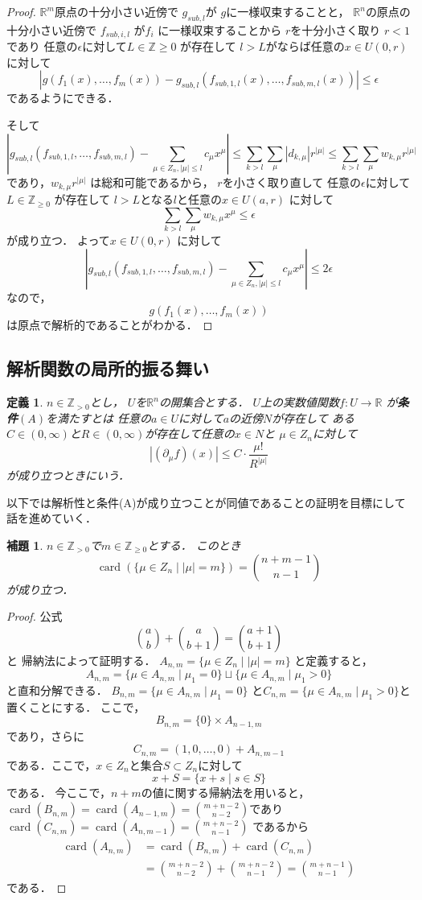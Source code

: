 \documentclass[leqno, a4paper, 12pt]{jsarticle}
\newtheorem{lem}[thm]{補題}
\newtheorem{df}[thm]{定義}
\newcommand{\zz}{\mathbb{Z}}
\newcommand{\rr}{\mathbb{R}}
\DeclareMathOperator{\card}{card}
\begin{document}
\begin{proof}
$\rr^m$原点の十分小さい近傍で
$g_{sub, l}$が
$g$に一様収束することと，
$\rr^n$の原点の十分小さい近傍で
$f_{sub, i, l}$
が$f_{i}$
に一様収束することから
$r$を十分小さく取り
$r<1$であり
任意の$\epsilon$に対して$L\in \zz{\ge 0}$
が存在して
$l>L$がならば任意の$x\in U(0, r)$に対して
\[
|g(f_1(x), \dots, f_m(x))-g_{sub, l}(f_{sub, 1, l}(x), \dots, f_{sub, m, l}(x))|
\le \epsilon
\]
であるようにできる．

そして
\[
\left|
g_{sub, l}(f_{sub, 1, l}, \dots, f_{sub, m, l})-
\sum_{\mu\in Z_n, |\mu|\le l}c_{\mu}x^{\mu}
\right|
\le \sum_{k>l}\sum_{\mu}|d_{k, \mu}|r^{|\mu|}
\le \sum_{k>l}\sum_{\mu}w_{k, \mu}r^{|\mu|} 
\]
であり，$w_{k, \mu}r^{|\mu|}$
は総和可能であるから，
$r$を小さく取り直して
任意の$\epsilon$に対して$L\in \zz_{\ge 0}$
が存在して
$l>L$となる$l$と任意の$x\in U(a, r)$
に対して
\[
\sum_{k>l}\sum_{\mu}w_{k, \mu}x^{\mu}\le \epsilon
\]
が成り立つ．
よって$x\in U(0, r)$
に対して
\[
\left|
g_{sub, l}(f_{sub, 1, l}, \dots, f_{sub, m, l})-
\sum_{\mu\in Z_n, |\mu|\le l}c_{\mu}x^{\mu}
\right|\le 2\epsilon
\]
なので，
\[
g(f_1(x), \dots, f_m(x))
\]
は原点で解析的であることがわかる．
\end{proof}

\subsection{解析関数の局所的振る舞い}
\begin{df}
$n\in \zz_{>0}$とし，
$U$を$\rr^n$の開集合とする．
$U$上の実数値関数$f: U\to \rr$
が\textbf{条件$(A)$}を満たすとは
任意の$a\in U$に対して$a$の近傍$N$が存在して
ある$C\in (0, \infty)$と$R\in (0, \infty)$が存在して任意の$x\in N$と
$\mu\in Z_n$に対して
\[
|(\partial_{\mu}f)(x)|\le C\cdot\frac{\mu!}{R^{|\mu|}}
\]
が成り立つときにいう．
\end{df}
以下では解析性と条件(A)が成り立つことが同値であることの証明を目標にして話を進めていく．
\begin{lem}
$n\in \zz_{>0}$で$m\in \zz_{\ge 0}$とする．
このとき
\[
\card(\{\mu\in Z_n\mid |\mu|=m\})=\binom{n+m-1}{n-1}
\]
が成り立つ．
\end{lem}
\begin{proof}
公式
\[
\binom{a}{b}+\binom{a}{b+1}=\binom{a+1}{b+1}
\]と
帰納法によって証明する．
$A_{n, m}=\{\mu\in Z_n\mid |\mu|=m\}$
と定義すると，
\[
A_{n, m}=\{\mu\in A_{n, m}\mid \mu_1=0\}\sqcup\{\mu \in A_{n, m}\mid \mu_1>0\}
\]
と直和分解できる．
$B_{n, m}=\{\mu\in A_{n, m}\mid \mu_1=0\}$
と$C_{n, m}=\{\mu \in A_{n, m}\mid \mu_1>0\}
$と置くことにする．
ここで，
\[
B_{n, m}=\{0\}\times A_{n-1, m}
\]
であり，さらに
\[
C_{n, m}
=(1, 0, \dots, 0)+A_{n, m-1}
\]
である．ここで，$x\in Z_n$と集合$S\subset Z_n$に対して
\[
x+S=\{x+s\mid s\in S\}
\]
である．
今ここで，$n+m$の値に関する帰納法を用いると，
$\card(B_{n, m})=\card(A_{n-1, m})=\binom{m+n-2}{n-2}$であり
$\card(C_{n, m})=\card(A_{n, m-1})=\binom{m+n-2}{n-1}$
であるから
\begin{align*}
\card(A_{n, m})&=\card(B_{n, m})+\card(C_{n, m})\\
&=\binom{m+n-2}{n-2}+\binom{m+n-2}{n-1}=\binom{m+n-1}{n-1}
\end{align*}
である．
\end{proof}
\end{document}
